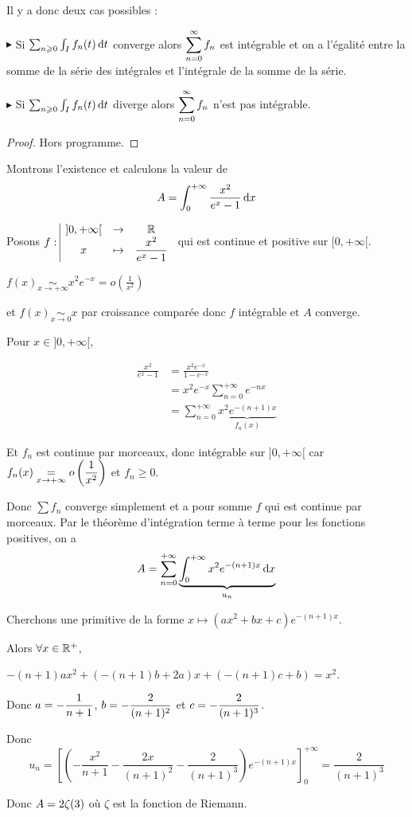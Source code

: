 Il y a donc deux cas possibles : 

$\blacktriangleright$ Si $\sum_{n \geqslant 0} \int_I f_n(t) \,\mathrm{d}t$ converge alors $\displaystyle \sum_{n = 0}^{\infty} f_n$ est intégrable 
et on a l'égalité entre la somme de la série des intégrales et l'intégrale de la somme de la série.

\avspace $\blacktriangleright$ Si $\sum_{n \geqslant 0} \int_I f_n(t) \,\mathrm{d}t$ diverge alors $\displaystyle \sum_{n = 0}^{\infty} f_n$ n'est pas intégrable.

\begin{proof}
    Hors programme. 
\end{proof}

\begin{exemple}
    Montrons l'existence et calculons la valeur de
    $$ A = \int_{0}^{+ \infty} \frac{x^2}{e^x - 1} \,\mathrm{d}x$$ 

    Posons $f: \space \begin{array}{|ccc} \displaystyle ]0, + \infty[ & \to & \displaystyle \mathbb{R} \\ \displaystyle x & \mapsto & \displaystyle \frac{x^2}{e^x - 1} \end{array}$ qui est continue et positive sur $[0, + \infty[$.

    $f(x) \underset{x \to + \infty}{\sim} x^2 e^{-x} = o\left( \frac 1 {x^2} \right)$ 
    
    et $f(x) \underset{x \to 0 }{\sim} x$ par croissance comparée donc $f$ intégrable et $A$ converge. 

    \avspace Pour $x \in ]0, + \infty[$, 
    
    \begin{align}
        \frac{x^2}{e^x - 1 } & = \frac{x^2 e^{-x}}{1 - e^{-x}} \\
        & = x^2 e^{-x} \sum_{n = 0}^{+ \infty} e^{-nx} \\
        & = \sum_{n = 0}^{+ \infty} \underbrace{x^2 e^{-(n + 1)x}}_{f_n(x)}
    \end{align}

    Et $f_n$ est continue par morceaux, donc intégrable sur $]0, + \infty[$ car \\
    $\displaystyle f_n(x) \underset{x \to + \infty}{=} o\left( \frac 1 {x^2} \right)$ et $f_n \geqslant 0$.

    Donc $\sum f_n$ converge simplement et a pour somme $f$ qui est continue par morceaux.
    Par le théorème d'intégration terme à terme pour les fonctions positives, on a
    $$A = \sum_{n = 0}^{+ \infty} \underbrace{\int_0^{+ \infty} x^2 e^{-(n + 1)x} \,\mathrm{d}x}_{u_n}$$

    Cherchons une primitive de la forme $x \mapsto (ax^2 + bx + c)e^{-(n + 1)x}$.

    Alors $\forall x \in \mathbb{R}^+$,

    $-(n+1)ax^2 + (-(n + 1)b + 2a)x + (-(n + 1)c + b) = x^2$.

    Donc $\displaystyle a = - \frac 1 {n + 1}$, $\displaystyle b = - \frac 2 {(n + 1)^2}$ et $\displaystyle c = - \frac 2 {(n + 1)^3}$.

    Donc 
    $$u_n = \left[ \left( - \frac{x^2}{n + 1} - \frac{2x}{(n + 1)^2} - \frac{2}{(n + 1)^3} \right) e^{-(n + 1)x} \right]_0^{+ \infty} = \frac{2}{(n + 1)^3}$$

    Donc $\displaystyle A = 2 \zeta(3)$ où $\zeta$ est la fonction de Riemann.
\end{exemple}

